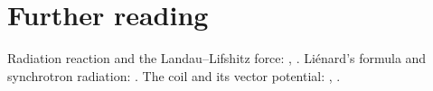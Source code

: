 \documentclass{leveldoc}
\begin{document}
\section{Further reading}\label{sec:reading}

Radiation reaction and the Landau--Lifshitz force: , .
Liénard's formula and synchrotron radiation: . The coil and its vector
potential: , .

\levelfileappendix
\end{document}

